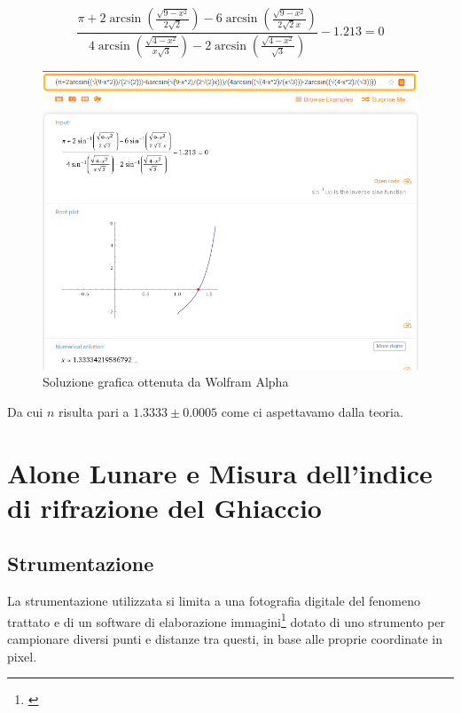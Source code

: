 \documentclass{report}[a4paper,11pt]
\begin{document}
\begin{equation}\label{eq: radii}
\frac{\pi + 2\arcsin\left(\frac{\sqrt{9-x^2}}{2\sqrt{2}}\right) - 6\arcsin\left(\frac{\sqrt{9-x^2}}{2\sqrt{2}x}\right)}{4\arcsin\left(\frac{\sqrt{4-x^2}}{x\sqrt{3}}\right) - 2\arcsin\left(\frac{\sqrt{4-x^2}}{\sqrt{3}}\right)} -1.213 = 0
\end{equation}
\begin{figure}[H]
  \begin{center}
    \includegraphics[width=\textwidth]{./figs/wolfram.png}
  \end{center}
  \caption{Soluzione grafica ottenuta da Wolfram Alpha \cite{wolfram}}
\end{figure}
Da cui $n$ risulta pari a $1.3333 \pm 0.0005 $ come ci aspettavamo dalla teoria.

\chapter{Alone Lunare e Misura dell'indice di rifrazione del Ghiaccio}
\section{Strumentazione}
La strumentazione utilizzata si limita a una fotografia digitale del fenomeno trattato e di un software di elaborazione immagini\footnote{\cite{gimp}} dotato di uno strumento per campionare diversi punti e distanze tra questi, in base alle proprie coordinate in pixel.
\end{document}
